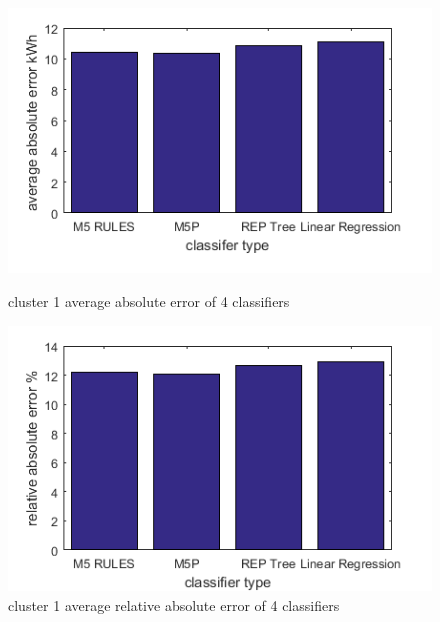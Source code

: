 \begin{figure}
\centering
\begin{minipage}{.5\textwidth}
  \centering
  \includegraphics[width=\linewidth]{cluster-1-diff-classifier-avg-abs.png}
  \caption{cluster 1 average absolute error of 4 classifiers}
  \label{fig:cluster-1-predictors}
\end{minipage}%
\begin{minipage}{.5\textwidth}
  \centering
  \includegraphics[width=\linewidth]{cluster-1-diff-classifier-relative-abs.png}
  \caption{cluster 1 average relative absolute error of 4 classifiers}
\end{minipage}


\end{figure}

